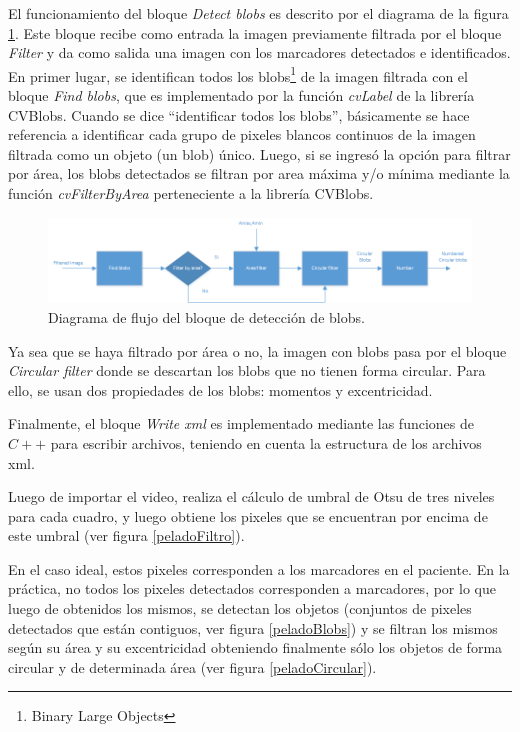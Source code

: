 El funcionamiento del bloque \emph{Detect blobs} es descrito por el diagrama de la figura \ref{diagramadetectblobs}. Este bloque recibe como entrada la imagen previamente filtrada por el bloque \emph{Filter} y da como salida una imagen con los marcadores detectados e identificados. En primer lugar, se identifican todos los blobs\footnote{Binary Large Objects\cite{defBlob}} de la imagen filtrada con el bloque \emph{Find blobs}, que es implementado por la función \emph{cvLabel} de la librería CVBlobs\cite{cvblob}. Cuando se dice ``identificar todos los blobs'', básicamente se hace referencia a identificar cada grupo de pixeles blancos continuos de la imagen filtrada como un objeto (un blob) único. Luego, si se ingresó la opción para filtrar por área, los blobs\cite{defBlobs} detectados se filtran por area máxima y/o mínima mediante la función \emph{cvFilterByArea} perteneciente a la librería CVBlobs\cite{cvblob}. 

\begin{figure}[H]
\begin{center}
\includegraphics[scale=0.7]{img/detectBlobs_diagrama.png}
\end{center}
\caption{Diagrama de flujo del bloque de detección de blobs.}
\label{diagramadetectblobs}
\end{figure}

Ya sea que se haya filtrado por área o no, la imagen con blobs pasa por el bloque \emph{Circular filter} donde se descartan los blobs que no tienen forma circular. Para ello, se usan dos propiedades de los blobs: momentos y excentricidad.


Finalmente, el bloque \emph{Write xml} es implementado mediante las funciones de $C++$ para escribir archivos, teniendo en cuenta la estructura de los archivos xml\cite{xml}.

Luego de importar el video, realiza el cálculo de umbral de Otsu\cite{otsu} de tres niveles para cada cuadro, y luego obtiene los pixeles que se encuentran por encima de este umbral (ver figura \ref{peladoFiltro}). 

En el caso ideal, estos pixeles corresponden a los marcadores en el paciente. En la práctica, no todos los pixeles detectados corresponden a marcadores, por lo que luego de obtenidos los mismos, se detectan los objetos (conjuntos de pixeles detectados que están contiguos, ver figura \ref{peladoBlobs}) y se filtran los mismos según su área y su excentricidad obteniendo finalmente sólo los objetos de forma circular y de determinada área (ver figura \ref{peladoCircular}).

